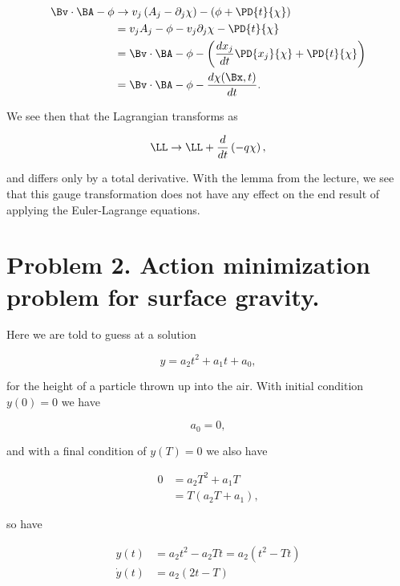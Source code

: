 \begin{align*}
\Bv \cdot \BA - \phi
&\rightarrow 
v_j \left(A_j - \partial_j \chi \right) - \left(\phi + \PD{t}{\chi} \right) \\
&=
v_j A_j - \phi - v_j \partial_j \chi - \PD{t}{\chi} \\
&=
\Bv \cdot \BA - \phi
- \left( \frac{d x_j}{dt} \PD{x_j}{\chi} + \PD{t}{\chi} \right) \\
&=
\Bv \cdot \BA - \phi
- \frac{d \chi(\Bx, t)}{dt}.
\end{align*}

We see then that the Lagrangian transforms as

\begin{equation}\label{eqn:classicalMechanicsPs1:160}
\LL \rightarrow \LL + \frac{d}{dt}\left( -q \chi \right),
\end{equation}

and differs only by a total derivative.  With the lemma from the lecture, we see that this gauge transformation does not have any effect on the end result of applying the Euler-Lagrange equations.

\section{Problem 2.  Action minimization problem for surface gravity.}

Here we are told to guess at a solution

\begin{equation}\label{eqn:classicalMechanicsPs1:180}
y = a_2 t^2 + a_1 t + a_0,
\end{equation}

for the height of a particle thrown up into the air.  With initial condition $y(0) = 0$ we have

\begin{equation}\label{eqn:classicalMechanicsPs1:200}
a_0 = 0,
\end{equation}

and with a final condition of $y(T) = 0$ we also have

\begin{align*}
0 
&= 
a_2 T^2 + a_1 T \\
&= T( a_2 T + a_1 ),
\end{align*}

so have

\begin{align}\label{eqn:classicalMechanicsPs1:220}
y(t) &= a_2 t^2 - a_2 T t = a_2 (t^2 - T t) \\
\dot{y}(t) &= 
a_2 (2 t - T )
\end{align}

